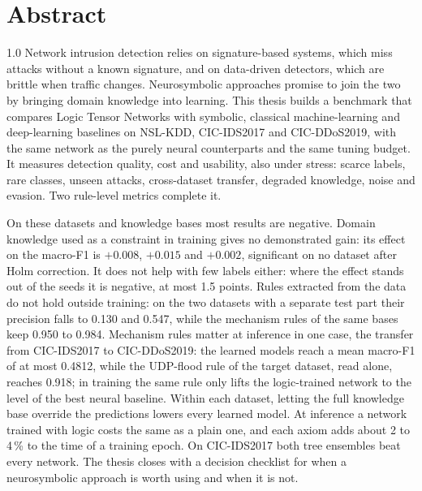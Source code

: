 \chapter*{Abstract}

\begin{spacing}{1.0}
Network intrusion detection relies on signature-based systems, which miss attacks without a known
signature, and on data-driven detectors, which are brittle when traffic changes. Neurosymbolic
approaches promise to join the two by bringing domain knowledge into learning. This thesis builds a
benchmark that compares Logic Tensor Networks with symbolic, classical machine-learning and
deep-learning baselines on NSL-KDD, CIC-IDS2017 and CIC-DDoS2019, with the same network as the
purely neural counterparts and the same tuning budget. It measures detection quality, cost and
usability, also under stress: scarce labels, rare classes, unseen attacks, cross-dataset transfer,
degraded knowledge, noise and evasion. Two rule-level metrics complete it.

On these datasets and knowledge bases most results are negative. Domain knowledge used as a
constraint in training gives no demonstrated gain: its effect on the macro-F1 is $+0.008$, $+0.015$
and $+0.002$, significant on no dataset after Holm correction. It does not help with few labels
either: where the effect stands out of the seeds it is negative, at most 1.5 points. Rules
extracted from the data do not hold outside training: on the two datasets with a separate test part
their precision falls to 0.130 and 0.547, while the mechanism rules of the same bases keep 0.950 to
0.984. Mechanism rules matter at inference in one case, the transfer from CIC-IDS2017 to
CIC-DDoS2019: the learned models reach a mean macro-F1 of at most 0.4812, while the UDP-flood rule of the
target dataset, read alone, reaches 0.918; in training the same rule only lifts the logic-trained
network to the level of the best neural baseline. Within each dataset, letting the full knowledge base override the
predictions lowers every learned model. At inference a network trained with logic costs the same as
a plain one, and each axiom adds about 2 to 4\,\% to the time of a training epoch. On CIC-IDS2017 both
tree ensembles beat every network. The thesis closes with a decision checklist for when a
neurosymbolic approach is worth using and when it is not.
\end{spacing}
